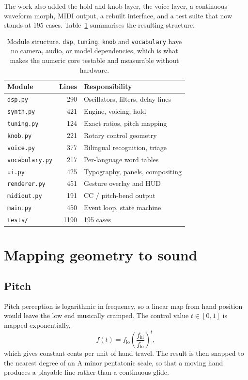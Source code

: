 \documentclass[a4paper,11pt]{article}
\newcommand{\code}[1]{\texttt{\small #1}}
\begin{document}
The work also added the hold-and-knob layer, the voice layer, a continuous
waveform morph, MIDI output, a rebuilt interface, and a test suite that now
stands at 195 cases. Table~\ref{tab:modules} summarises the resulting
structure.

\begin{table}[htbp]
\centering\small
\begin{tabular}{@{}lrl@{}}
\toprule
Module & Lines & Responsibility \\
\midrule
\code{dsp.py}        & 290 & Oscillators, filters, delay lines \\
\code{synth.py}      & 421 & Engine, voicing, hold \\
\code{tuning.py}     & 124 & Exact ratios, pitch mapping \\
\code{knob.py}       & 221 & Rotary control geometry \\
\code{voice.py}      & 377 & Bilingual recognition, triage \\
\code{vocabulary.py} & 217 & Per-language word tables \\
\code{ui.py}         & 425 & Typography, panels, compositing \\
\code{renderer.py}   & 451 & Gesture overlay and HUD \\
\code{midiout.py}    & 191 & CC / pitch-bend output \\
\code{main.py}       & 450 & Event loop, state machine \\
\midrule
\code{tests/}        & 1190 & 195 cases \\
\bottomrule
\end{tabular}
\caption{Module structure. \code{dsp}, \code{tuning}, \code{knob} and
\code{vocabulary} have no camera, audio, or model dependencies, which is what
makes the numeric core testable and measurable without hardware.}
\label{tab:modules}
\end{table}

\section{Mapping geometry to sound}

\subsection{Pitch}

Pitch perception is logarithmic in frequency, so a linear map from hand
position would leave the low end musically cramped. The control value
$t\in[0,1]$ is mapped exponentially,
\begin{equation}
f(t) = f_{\text{lo}}\left(\frac{f_{\text{hi}}}{f_{\text{lo}}}\right)^{t},
\end{equation}
which gives constant cents per unit of hand travel. The result is then snapped
to the nearest degree of an A minor pentatonic scale, so that a moving hand
produces a playable line rather than a continuous glide.
\end{document}

